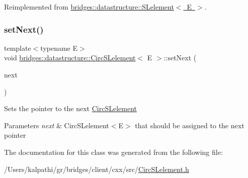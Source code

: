 Reimplemented from \mbox{\hyperlink{classbridges_1_1datastructure_1_1_s_lelement_ae43dd771d9ced7cb17f1d35f34cd9a42}{bridges\+::datastructure\+::\+S\+Lelement$<$ E $>$}}.

\mbox{\label{classbridges_1_1datastructure_1_1_circ_s_lelement_a623d302217fce43a444e6da5e1de9b40}} 
\subsubsection{\texorpdfstring{set\+Next()}{setNext()}}
{\footnotesize\ttfamily template$<$typename E$>$ \\
void \mbox{\hyperlink{classbridges_1_1datastructure_1_1_circ_s_lelement}{bridges\+::datastructure\+::\+Circ\+S\+Lelement}}$<$ E $>$\+::set\+Next (\begin{DoxyParamCaption}\item[{\mbox{\hyperlink{classbridges_1_1datastructure_1_1_circ_s_lelement}{Circ\+S\+Lelement}}$<$ E $>$ $\ast$}]{next }\end{DoxyParamCaption})\hspace{0.3cm}{\ttfamily [inline]}}

Sets the pointer to the next \mbox{\hyperlink{classbridges_1_1datastructure_1_1_circ_s_lelement}{Circ\+S\+Lelement}} 
\begin{DoxyParams}{Parameters}
{\em next} & Circ\+S\+Lelement$<$\+E$>$ that should be assigned to the next pointer \\
\hline
\end{DoxyParams}


The documentation for this class was generated from the following file\+:\begin{DoxyCompactItemize}
\item 
/\+Users/kalpathi/gr/bridges/client/cxx/src/\mbox{\hyperlink{_circ_s_lelement_8h}{Circ\+S\+Lelement.\+h}}\end{DoxyCompactItemize}
